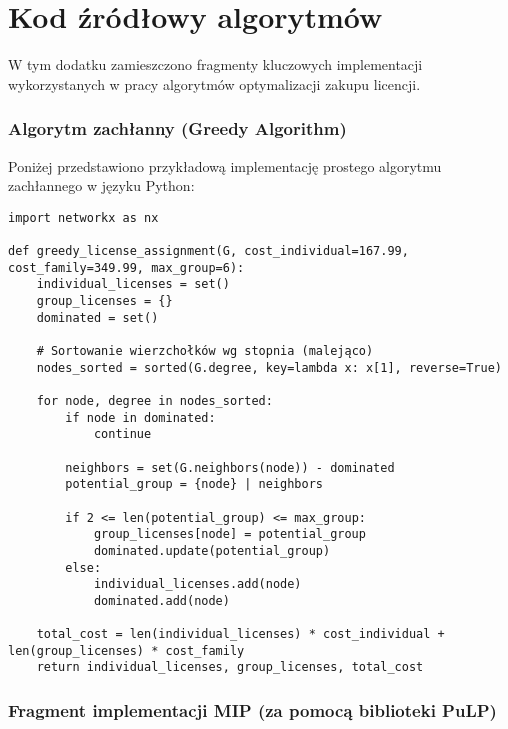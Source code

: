 \appendix

\chapter{Kod źródłowy algorytmów}

W tym dodatku zamieszczono fragmenty kluczowych implementacji wykorzystanych w pracy algorytmów optymalizacji zakupu licencji.

\subsection{Algorytm zachłanny (Greedy Algorithm)}

Poniżej przedstawiono przykładową implementację prostego algorytmu zachłannego w języku Python:

\begin{verbatim}
import networkx as nx

def greedy_license_assignment(G, cost_individual=167.99, cost_family=349.99, max_group=6):
    individual_licenses = set()
    group_licenses = {}
    dominated = set()

    # Sortowanie wierzchołków wg stopnia (malejąco)
    nodes_sorted = sorted(G.degree, key=lambda x: x[1], reverse=True)

    for node, degree in nodes_sorted:
        if node in dominated:
            continue

        neighbors = set(G.neighbors(node)) - dominated
        potential_group = {node} | neighbors

        if 2 <= len(potential_group) <= max_group:
            group_licenses[node] = potential_group
            dominated.update(potential_group)
        else:
            individual_licenses.add(node)
            dominated.add(node)

    total_cost = len(individual_licenses) * cost_individual + len(group_licenses) * cost_family
    return individual_licenses, group_licenses, total_cost
\end{verbatim}

\subsection{Fragment implementacji MIP (za pomocą biblioteki PuLP)}

